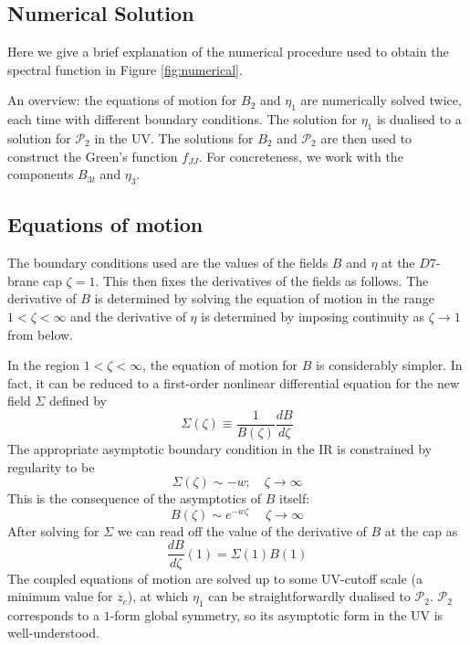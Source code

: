 \documentclass[aps,preprint,nofootinbib,preprintnumbers,eqsecnum,superscriptaddress]{revtex4}
\begin{document}
\begin{appendix}
\section{Numerical Solution}
\label{code-appendix}
Here we give a brief explanation of the numerical procedure used to obtain the spectral function in Figure \ref{fig:numerical}.

An overview: the equations of motion for $B_2$ and $\eta_1$ are numerically solved twice, each time with different boundary conditions. The solution for $\eta_1$ is dualised to a solution for $\mathcal{P}_2$ in the UV. The solutions for $B_2$ and $\mathcal{P}_2$ are then used to construct the Green's function $f_{JJ}$. For concreteness, we work with the components $B_{3t}$ and $\eta_3$.
\subsection{Equations of motion}
The boundary conditions used are the values of the fields $B$ and $\eta$ at the $D7$-brane cap $\zeta = 1$. This then fixes the derivatives of the fields as follows. The derivative of $B$ is determined by solving the equation of motion in the range $1 < \zeta < \infty$ and the derivative of $\eta$ is determined by imposing continuity as $\zeta \to 1$ from below.

In the region $1 < \zeta < \infty$, the equation of motion for $B$ is considerably simpler. In fact, it can be reduced to a first-order nonlinear differential equation for the new field $\Sigma$ defined by
\begin{equation}
	\Sigma(\zeta) \equiv \frac{1}{B(\zeta)} \frac{dB}{d\zeta}
\end{equation}
The appropriate asymptotic boundary condition in the IR is constrained by regularity to be 
\begin{equation}
	\Sigma(\zeta) \sim - w; \quad \zeta \to \infty 
\end{equation}
This is the consequence of the asymptotics of $B$ itself:
\begin{equation}
	B(\zeta) \sim e^{-w \zeta}\; \quad \zeta \to \infty 
\end{equation}
After solving for $\Sigma$ we can read off the value of the derivative of $B$ at the cap as
\begin{equation}
	\frac{dB}{d\zeta}(1) = \Sigma(1) B(1)
\end{equation}
The coupled equations of motion are solved up to some UV-cutoff scale (a minimum value for $z_c$), at which $\eta_1$ can be straightforwardly dualised to $\mathcal{P}_2$. $\mathcal{P}_2$ corresponds to a $1$-form global symmetry, so its asymptotic form in the UV is well-understood. 


\end{appendix}
\end{document}
